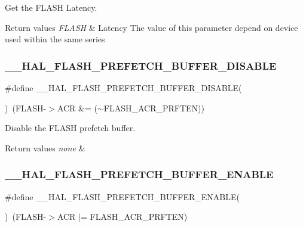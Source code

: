 Get the F\+L\+A\+SH Latency. 


\begin{DoxyRetVals}{Return values}
{\em F\+L\+A\+SH} & Latency The value of this parameter depend on device used within the same series \\
\hline
\end{DoxyRetVals}
\mbox{\label{group___f_l_a_s_h___exported___macros_ga646a4cb92e85659334d14a8c78f0ede8}} 
\subsubsection{\texorpdfstring{\_\_HAL\_FLASH\_PREFETCH\_BUFFER\_DISABLE}{\_\_HAL\_FLASH\_PREFETCH\_BUFFER\_DISABLE}}
{\footnotesize\ttfamily \#define \+\_\+\+\_\+\+H\+A\+L\+\_\+\+F\+L\+A\+S\+H\+\_\+\+P\+R\+E\+F\+E\+T\+C\+H\+\_\+\+B\+U\+F\+F\+E\+R\+\_\+\+D\+I\+S\+A\+B\+LE(\begin{DoxyParamCaption}{ }\end{DoxyParamCaption})~(F\+L\+A\+SH-\/$>$A\+CR \&= ($\sim$F\+L\+A\+S\+H\+\_\+\+A\+C\+R\+\_\+\+P\+R\+F\+T\+EN))}



Disable the F\+L\+A\+SH prefetch buffer. 


\begin{DoxyRetVals}{Return values}
{\em none} & \\
\hline
\end{DoxyRetVals}
\mbox{\label{group___f_l_a_s_h___exported___macros_gad36059641057f824516303ea92734e6f}} 
\subsubsection{\texorpdfstring{\_\_HAL\_FLASH\_PREFETCH\_BUFFER\_ENABLE}{\_\_HAL\_FLASH\_PREFETCH\_BUFFER\_ENABLE}}
{\footnotesize\ttfamily \#define \+\_\+\+\_\+\+H\+A\+L\+\_\+\+F\+L\+A\+S\+H\+\_\+\+P\+R\+E\+F\+E\+T\+C\+H\+\_\+\+B\+U\+F\+F\+E\+R\+\_\+\+E\+N\+A\+B\+LE(\begin{DoxyParamCaption}{ }\end{DoxyParamCaption})~(F\+L\+A\+SH-\/$>$A\+CR $\vert$= F\+L\+A\+S\+H\+\_\+\+A\+C\+R\+\_\+\+P\+R\+F\+T\+EN)}



